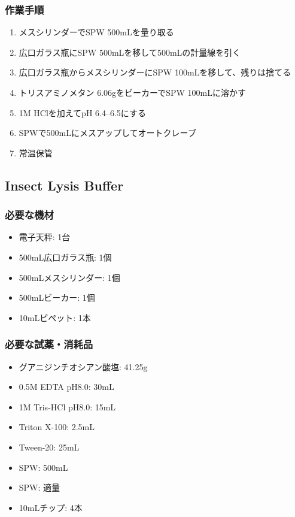 \documentclass[titlepage,10pt,a4paper]{jsbook}
\begin{document}
\subsubsection{作業手順}
\begin{enumerate}
\item メスシリンダーでSPW 500mLを量り取る
\item 広口ガラス瓶にSPW 500mLを移して500mLの計量線を引く
\item 広口ガラス瓶からメスシリンダーにSPW 100mLを移して、残りは捨てる
\item トリスアミノメタン 6.06gをビーカーでSPW 100mLに溶かす
\item 1M HClを加えてpH 6.4--6.5にする
\item SPWで500mLにメスアップしてオートクレーブ
\item 常温保管
\end{enumerate}

\subsection{Insect Lysis Buffer}

\subsubsection{必要な機材}
\begin{itemize}
\item 電子天秤: 1台
\item 500mL広口ガラス瓶: 1個
\item 500mLメスシリンダー: 1個
\item 500mLビーカー: 1個
\item 10mLピペット: 1本
\end{itemize}

\subsubsection{必要な試薬・消耗品}
\begin{itemize}
\item グアニジンチオシアン酸塩: 41.25g
\item 0.5M EDTA pH8.0: 30mL
\item 1M Tris-HCl pH8.0: 15mL
\item Triton X-100: 2.5mL
\item Tween-20: 25mL
\item SPW: 500mL
\item SPW: 適量
\item 10mLチップ: 4本
\end{itemize}
\end{document}
